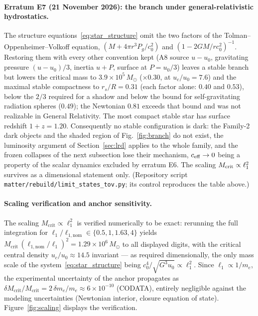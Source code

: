 \documentclass[11pt,a4paper]{article}
\theoremstyle{plain}
\theoremstyle{remark}
\begin{document}
\paragraph{Erratum E7 (21 November 2026): the branch under general-relativistic hydrostatics.} The structure equations~\eqref{eq:star_structure} omit the two factors of the Tolman--Oppenheimer--Volkoff equation, $(M + 4\pi r^3 P_g/c_0^2)$ and $(1 - 2GM/rc_0^2)^{-1}$. Restoring them with every other convention kept (A8 source $u - u_0$, gravitating pressure $(u-u_0)/3$, inertia $u + P$, surface at $P = u_0/3$) leaves a stable branch but lowers the critical mass to $3.9\times10^{5}\,M_\odot$ ($\times0.30$, at $u_c/u_0 = 7.6$) and the maximal stable compactness to $r_s/R = 0.31$ (each factor alone: $0.40$ and $0.53$), below the $2/3$ required for a shadow and below the bound for self-gravitating radiation spheres ($0.49$); the Newtonian $0.81$ exceeds that bound and was not realizable in General Relativity. The most compact stable star has surface redshift $1+z = 1.20$. Consequently no stable configuration is dark: the Family-2 dark objects and the shaded region of Fig.~\ref{fig:branch} do not exist, the luminosity argument of Section~\ref{sec:lrd} applies to the whole family, and the frozen collapses of the next subsection lose their mechanism, $c_{\rm eff}\to0$ being a property of the scalar dynamics excluded by erratum E6. The scaling $M_{\rm crit}\propto\ell_1^2$ survives as a dimensional statement only. (Repository script \texttt{matter/rebuild/limit\_states\_tov.py}; its control reproduces the table above.)

\paragraph{Scaling verification and anchor sensitivity.} The scaling $M_{\text{crit}} \propto \ell_1^2$ is verified numerically to be exact: rerunning the full integration for $\ell_1/\ell_{1,\text{nom}} \in \{0.5, 1, 1.63, 4\}$ yields $M_{\text{crit}}\,(\ell_{1,\text{nom}}/\ell_1)^2 = 1.29\times10^{6}\,M_\odot$ to all displayed digits, with the critical central density $u_c/u_0 \approx 14.5$ invariant --- as required dimensionally, the only mass scale of the system~\eqref{eq:star_structure} being $c_0^4/\sqrt{G^3 u_0} \propto \ell_1^2$. Since $\ell_1 \propto 1/m_e$, the experimental uncertainty of the anchor propagates as $\delta M_{\text{crit}}/M_{\text{crit}} = 2\,\delta m_e/m_e \approx 6\times10^{-10}$ (CODATA), entirely negligible against the modeling uncertainties (Newtonian interior, closure equation of state). Figure~\ref{fig:scaling} displays the verification.
\end{document}
